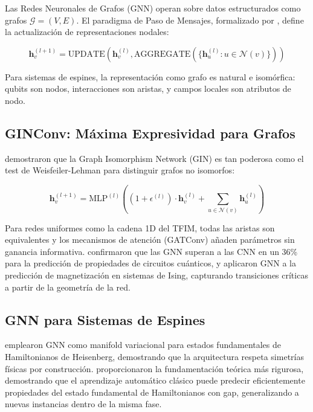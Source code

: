 \documentclass[11pt,a4paper,spanish]{book}
\begin{document}
Las Redes Neuronales de Grafos (GNN) operan sobre datos estructurados como grafos $\mathcal{G} = (V, E)$. El paradigma de Paso de Mensajes, formalizado por \citet{gilmer2017}, define la actualización de representaciones nodales:

\begin{equation}
\mathbf{h}_v^{(l+1)} = \text{UPDATE}\left(\mathbf{h}_v^{(l)}, \text{AGGREGATE}\left(\{\mathbf{h}_u^{(l)} : u \in \mathcal{N}(v)\}\right)\right)
\label{eq:mpnn}
\end{equation}

Para sistemas de espines, la representación como grafo es natural e isomórfica: qubits son nodos, interacciones son aristas, y campos locales son atributos de nodo.

\subsection{GINConv: Máxima Expresividad para Grafos}

\citet{xu2019} demostraron que la Graph Isomorphism Network (GIN) es tan poderosa como el test de Weisfeiler-Lehman para distinguir grafos no isomorfos:

\begin{equation}
\mathbf{h}_v^{(l+1)} = \text{MLP}^{(l)}\left((1 + \epsilon^{(l)}) \cdot \mathbf{h}_v^{(l)} + \sum_{u \in \mathcal{N}(v)} \mathbf{h}_u^{(l)}\right)
\label{eq:ginconv}
\end{equation}

Para redes uniformes como la cadena 1D del TFIM, todas las aristas son equivalentes y los mecanismos de atención (GATConv) añaden parámetros sin ganancia informativa. \citet{meng2025} confirmaron que las GNN superan a las CNN en un 36\% para la predicción de propiedades de circuitos cuánticos, y \citet{slavin2025} aplicaron GNN a la predicción de magnetización en sistemas de Ising, capturando transiciones críticas a partir de la geometría de la red.

\subsection{GNN para Sistemas de Espines}

\citet{kochkov2021} emplearon GNN como manifold variacional para estados fundamentales de Hamiltonianos de Heisenberg, demostrando que la arquitectura respeta simetrías físicas por construcción. \citet{huang2022} proporcionaron la fundamentación teórica más rigurosa, demostrando que el aprendizaje automático clásico puede predecir eficientemente propiedades del estado fundamental de Hamiltonianos con gap, generalizando a nuevas instancias dentro de la misma fase.
\end{document}
